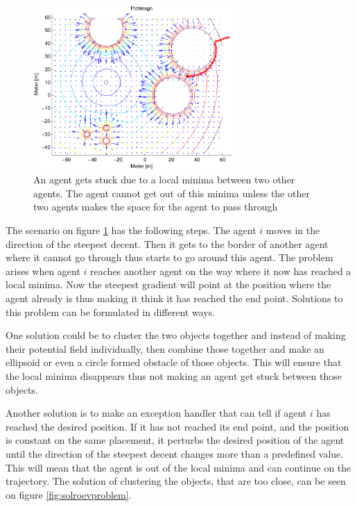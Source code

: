 \documentclass[conference]{IEEEtran}
\newcommand{\colwidth}{3in}
\begin{document}
\begin{figure}[htbp]
  \includegraphics[width=\colwidth]{fig/ftotmagnfigpdf3}
	\caption{An agent gets stuck due to a local minima between two other
	agents. The agent cannot get out of this minima unless the other two
	agents makes the space for the agent to pass through}
  \label{fig:roevproblem}
\end{figure}

The scenario on figure \ref{fig:roevproblem} has the following steps.
The agent $i$ moves in the direction of the steepest decent. Then it
gets to the border of another agent where it cannot go through thus
starts to go around this agent. The problem arises when agent $i$
reaches another agent on the way where it now has reached a local
minima. Now the steepest gradient will point at the position where the
agent already is thus making it think it has reached the end point.
Solutions to this problem can be formulated in different ways.

One solution could be to cluster the two objects together and instead
of making their potential field individually, then combine those
together and make an ellipsoid or even a circle formed obstacle of
those objects. This will ensure that the local minima disappears thus
not making an agent get stuck between those objects.

Another solution is to make an exception handler that can tell if
agent $i$ has reached the desired position. If it has not reached its
end point, and the position is constant on the same placement, it
perturbs the desired position of the agent until the direction of the
steepest decent changes more than a predefined value. This will mean
that the agent is out of the local minima and can continue on the
trajectory.  The solution of clustering the objects, that are too
close, can be seen on figure \ref{fig:solroevproblem}.
\end{document}
